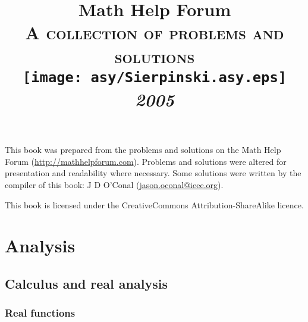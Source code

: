 \documentclass[a4paper,makeidx]{book}
\makeatletter
\renewcommand\tableofcontents{%
    \if@twocolumn
      \@restonecoltrue\onecolumn
    \else
      \@restonecolfalse
    \fi
    \chapter*{\contentsname}%
        \@mkboth{%
           \MakeUppercase\contentsname}{\MakeUppercase\contentsname}%
    \@starttoc{toc}%
    \if@restonecol\twocolumn\fi
    }
\makeatother
\begin{document}
    \title{Math Help Forum\\\vspace{12pt}\Large\textsc{A collection of problems and solutions}\\\vspace{24pt}\texttt{[image: asy/Sierpinski.asy.eps]}\\\vspace{24pt}\Huge\textit{2005}}
	\author{}
    \date{}

    \maketitle

	This book was prepared from the problems and solutions on the Math Help Forum (\url{http://mathhelpforum.com}). Problems and solutions were altered for presentation and readability where necessary. Some solutions were written by the compiler of this book: J D O'Conal (\url{jason.oconal@ieee.org}).

	This book is licensed under the CreativeCommons Attribution-ShareAlike licence.

	\begin{center}\Huge\bysa\normalsize\end{center}

    \tableofcontents




	\part{Analysis}

    \chapter{Calculus and real analysis}

	\section{Real functions}
\end{document}
